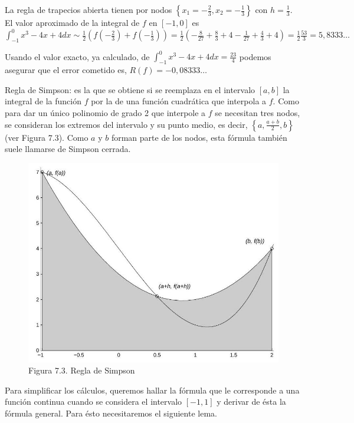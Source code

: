 \documentclass[10pt]{article}
\begin{document}
La regla de trapecios abierta tienen por nodos $\left\{x_{1}=-\frac{2}{3}, x_{2}=-\frac{1}{3}\right\}$ con $h=\frac{1}{3}$. El valor aproximado de la integral de $f$ en $[-1,0]$ es\\
$\int_{-1}^{0} x^{3}-4 x+4 d x \sim \frac{1}{2}\left(f\left(-\frac{2}{3}\right)+f\left(-\frac{1}{3}\right)\right)=\frac{1}{2}\left(-\frac{8}{27}+\frac{8}{3}+4-\frac{1}{27}+\frac{4}{3}+4\right)=\frac{1}{2} \frac{53}{3}=5,8333 \ldots$

Usando el valor exacto, ya calculado, de $\int_{-1}^{0} x^{3}-4 x+4 d x=\frac{23}{4}$ podemos asegurar que el error cometido es, $R(f)=-0,08333 \ldots$

Regla de Simpson: es la que se obtiene si se reemplaza en el intervalo $[a, b]$ la integral de la función $f$ por la de una función cuadrática que interpola a $f$. Como para dar un único polinomio de grado 2 que interpole a $f$ se necesitan tres nodos, se consideran los extremos del intervalo y su punto medio, es decir, $\left\{a, \frac{a+b}{2}, b\right\}$ (ver Figura 7.3). Como $a$ y $b$ forman parte de los nodos, esta fórmula también suele llamarse de Simpson cerrada.

\begin{figure}[h]
\begin{center}
  \includegraphics[width=\textwidth]{2025_09_05_3888c9ac96bd653d96b4g-141}
\captionsetup{labelformat=empty}
\caption{Figura 7.3. Regla de Simpson}
\end{center}
\end{figure}

Para simplificar los cálculos, queremos hallar la fórmula que le corresponde a una función continua cuando se considera el intervalo $[-1,1]$ y derivar de ésta la fórmula general. Para ésto necesitaremos el siguiente lema.
\end{document}
